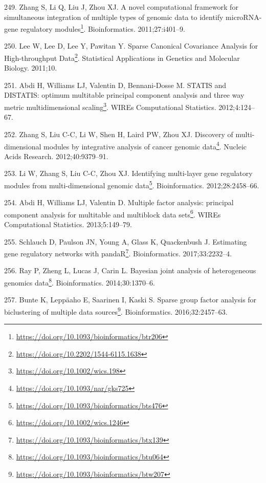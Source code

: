 \documentclass[
  a4paper,
]{book}
\DeclareRobustCommand{\href}[2]{#2\footnote{\url{#1}}}
\newlength{\cslhangindent}
\newlength{\cslentryspacingunit} %
\newenvironment{CSLReferences}[2] %
 {%
  \setlength{\parindent}{0pt}
  \ifodd #1
  \let\oldpar\par
  \def\par{\hangindent=\cslhangindent\oldpar}
  \fi
  \setlength{\parskip}{#2\cslentryspacingunit}
 }%
 {}
\begin{document}
\begin{CSLReferences}{0}{0}
\leavevmode{}%
249. Zhang S, Li Q, Liu J, Zhou XJ. \href{https://doi.org/10.1093/bioinformatics/btr206}{A novel computational framework for simultaneous integration of multiple types of genomic data to identify microRNA-gene regulatory modules}. Bioinformatics. 2011;27:i401--9.

\leavevmode{}%
250. Lee W, Lee D, Lee Y, Pawitan Y. \href{https://doi.org/10.2202/1544-6115.1638}{Sparse Canonical Covariance Analysis for High-throughput Data}. Statistical Applications in Genetics and Molecular Biology. 2011;10.

\leavevmode{}%
251. Abdi H, Williams LJ, Valentin D, Bennani-Dosse M. \href{https://doi.org/10.1002/wics.198}{STATIS and DISTATIS: optimum multitable principal component analysis and three way metric multidimensional scaling}. WIREs Computational Statistics. 2012;4:124--67.

\leavevmode{}%
252. Zhang S, Liu C-C, Li W, Shen H, Laird PW, Zhou XJ. \href{https://doi.org/10.1093/nar/gks725}{Discovery of multi-dimensional modules by integrative analysis of cancer genomic data}. Nucleic Acids Research. 2012;40:9379--91.

\leavevmode{}%
253. Li W, Zhang S, Liu C-C, Zhou XJ. \href{https://doi.org/10.1093/bioinformatics/bts476}{Identifying multi-layer gene regulatory modules from multi-dimensional genomic data}. Bioinformatics. 2012;28:2458--66.

\leavevmode{}%
254. Abdi H, Williams LJ, Valentin D. \href{https://doi.org/10.1002/wics.1246}{Multiple factor analysis: principal component analysis for multitable and multiblock data sets}. WIREs Computational Statistics. 2013;5:149--79.

\leavevmode{}%
255. Schlauch D, Paulson JN, Young A, Glass K, Quackenbush J. \href{https://doi.org/10.1093/bioinformatics/btx139}{Estimating gene regulatory networks with pandaR}. Bioinformatics. 2017;33:2232--4.

\leavevmode{}%
256. Ray P, Zheng L, Lucas J, Carin L. \href{https://doi.org/10.1093/bioinformatics/btu064}{Bayesian joint analysis of heterogeneous genomics data}. Bioinformatics. 2014;30:1370--6.

\leavevmode{}%
257. Bunte K, Leppäaho E, Saarinen I, Kaski S. \href{https://doi.org/10.1093/bioinformatics/btw207}{Sparse group factor analysis for biclustering of multiple data sources}. Bioinformatics. 2016;32:2457--63.


\end{CSLReferences}
\end{document}
